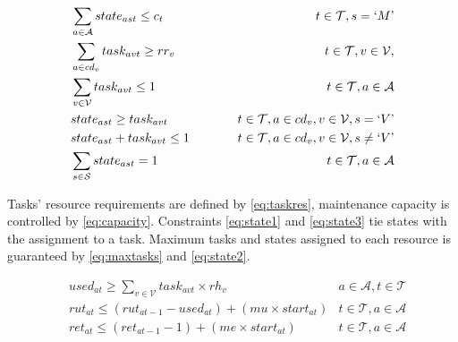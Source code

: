 \documentclass{roadef}
\newcommand{\mq}[1] {`#1\textrm'}
\begin{document}
    \begin{align}
        & \sum_{a \in \mathcal{A}} state_{ast} \leq c_{t}
                & t \in \mathcal{T}, s = \mq{M} \label{eq:capacity}\\
        & \sum_{a \in cd_v} task_{avt} \geq rr_{v}
                & t \in \mathcal{T}, v \in \mathcal{V},  \label{eq:taskres}\\
        & \sum_{v \in \mathcal{V}} task_{avt} \leq 1
                & t \in \mathcal{T}, a \in \mathcal{A} \label{eq:maxtasks}\\
        & state_{ast} \geq task_{avt} 
                & \hspace{10mm} t \in \mathcal{T}, a \in cd_v, v \in \mathcal{V}, s = \mq{V} \label{eq:state1}\\
        & state_{ast} + task_{avt} \leq 1
                & \hspace{10mm} t \in \mathcal{T}, a \in cd_v, v \in \mathcal{V}, s \neq \mq{V} \label{eq:state3}\\
        & \sum_{s \in \mathcal{S}} state_{ast} = 1 
                & \hspace{10mm} t \in \mathcal{T}, a \in \mathcal{A} \label{eq:state2}
    \end{align}

    Tasks' resource requirements are defined by \ref{eq:taskres}, maintenance capacity is controlled by \ref{eq:capacity}. Constraints \ref{eq:state1} and \ref{eq:state3} tie states with the assignment to a task. Maximum tasks and states assigned to each resource is guaranteed by \ref{eq:maxtasks} and \ref{eq:state2}.
        
    \begin{align}
        & used_{at} \geq \sum_{v \in \mathcal{V}} task_{avt} \times rh_{v}
                & a \in \mathcal{A}, t \in \mathcal{T} \label{eq:usage}\\
        & rut_{at} \leq (rut_{at-1} - used_{at}) + (mu \times start_{at})
                & t \in \mathcal{T}, a \in \mathcal{A} \label{eq:balance1}\\
        & ret_{at} \leq (ret_{at-1} - 1) + (me \times start_{at})
                & t \in \mathcal{T}, a \in \mathcal{A} \label{eq:balance2}
    \end{align}
    
\end{document}
